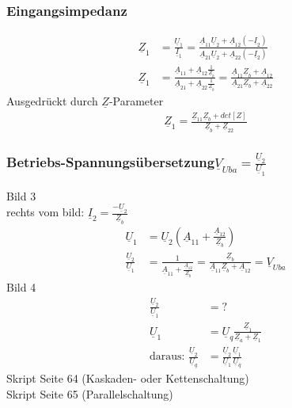 \subsubsection{Eingangsimpedanz}
\begin{align}
	\underline{Z}_1&=\frac{\underline{U}_1}{\underline{I}_1}=\frac{\underline{A}_{11}\underline{U}_{2}+\underline{A}_{12}\left(-\underline{I}_2\right)}{\underline{A}_{21}\underline{U}_2+\underline{A}_{22}\left(-\underline{I}_2\right)}\nonumber\\
	\underline{Z}_1&=\frac{\underline{A}_{11}+\underline{A}_{12}\frac{1}{\underline{Z}_b}}{\underline{A}_{21}+\underline{A}_{22}\frac{1}{\underline{Z}_b}}=\frac{\underline{A}_{11}\underline{Z}_b+\underline{A}_{12}}{\underline{A}_{21}\underline{Z}_b+\underline{A}_{22}}\nonumber
\end{align}
Ausgedrückt durch $\underline{Z}$-Parameter
\begin{align}
	\underline{Z}_1=\frac{\underline{Z}_{11}\underline{Z}_b+det[Z]}{\underline{Z}_b+\underline{Z}_{22}}\nonumber
\end{align}
\subsubsection{Betriebs-Spannungsübersetzung$\underline{V}_{Uba}=\frac{\underline{U}_{2}}{\underline{U}_{1}}$}
Bild 3\\
rechts vom bild:
$\underline{I}_{2}=\frac{-\underline{U}_{2}}{\underline{Z}_{b}}$\\
\begin{align}
	\underline{U}_{1}&=\underline{U}_{2}\left(\underline{A}_{11}+\frac{\underline{A}_{12}}{\underline{Z}_{b}}\right)\nonumber\\
	\frac{\underline{U}_{2}}{\underline{U}_{1}}&=\frac{1}{\underline{A}_{11}+\frac{\underline{A}_{12}}{\underline{Z}_{b}}}=\frac{\underline{Z}_{b}}{\underline{A}_{11}\underline{Z}_{b}+\underline{A}_{12}}=\underline{V}_{Uba}\nonumber
\end{align}
Bild 4\\
\begin{align}
 	\frac{\underline{U}_{2}}{\underline{U}_{1}}&=?\nonumber\\
	\underline{U}_{1}&=\underline{U}_{q}\frac{\underline{Z}_{1}}{\underline{Z}_{a}+\underline{Z}_{1}}\nonumber\\
	\text{daraus: }
	\frac{\underline{U}_{2}}{\underline{U}_{q}}&=\frac{\underline{U}_{2}}{\underline{U}_{1}}\frac{\underline{U}_{1}}{\underline{U}_{q}}\nonumber
\end{align}
Skript Seite 64 (Kaskaden- oder Kettenschaltung)\\
Skript Seite 65 (Parallelschaltung)\\